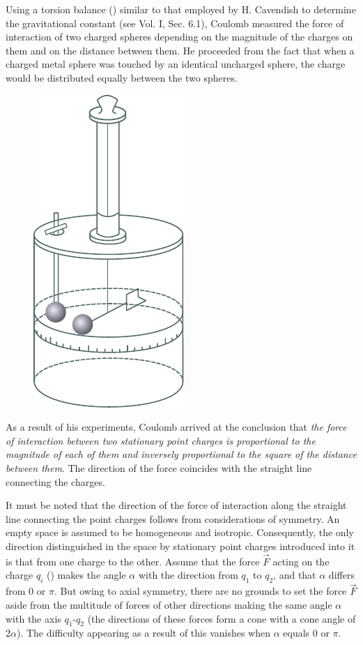 Using a torsion balance () similar to that employed by H. Cavendish to determine the gravitational constant (see Vol. I, Sec. 6.1), Coulomb measured the force of interaction of two charged spheres depending on the magnitude of the charges on them and on the distance between them. He proceeded from the fact that when a charged metal sphere was touched by an identical uncharged sphere, the charge would be distributed equally between the two spheres.

\begin{figure}[t]
	\begin{center}
		\includegraphics[scale=0.9]{figures/ch_01/fig_1_1.pdf}
		\caption[]{}
		\label{fig:1_1}
	\end{center}
	\vspace{-0.8cm}
\end{figure}

As a result of his experiments, Coulomb arrived at the conclusion that \textit{the force of interaction between two stationary point charges is proportional to the magnitude of each of them and inversely proportional
to the square of the distance between them}. The direction of the force coincides with the straight line connecting the charges.

It must be noted that the direction of the force of interaction along the straight line connecting the point charges follows from considerations of symmetry. An empty space is assumed to be homogeneous and isotropic. Consequently, the only direction distinguished in the space by stationary point charges introduced into it is that from one charge to the other. Assume that the force $\vec{F}$ acting on the charge $q_i$ () makes the angle $\alpha$ with the direction from $q_1$ to $q_2$, and that $\alpha$ differs from $0$ or $\pi$. But owing to axial symmetry, there are no grounds to set the force $\vec{F}$ aside from the multitude of forces of other directions making the same angle $\alpha$ with the axis $q_1$-$q_2$ (the directions of these forces form a cone with a cone angle of $2\alpha$). The difficulty appearing as a result of this vanishes when $\alpha$ equals $0$ or $\pi$.

